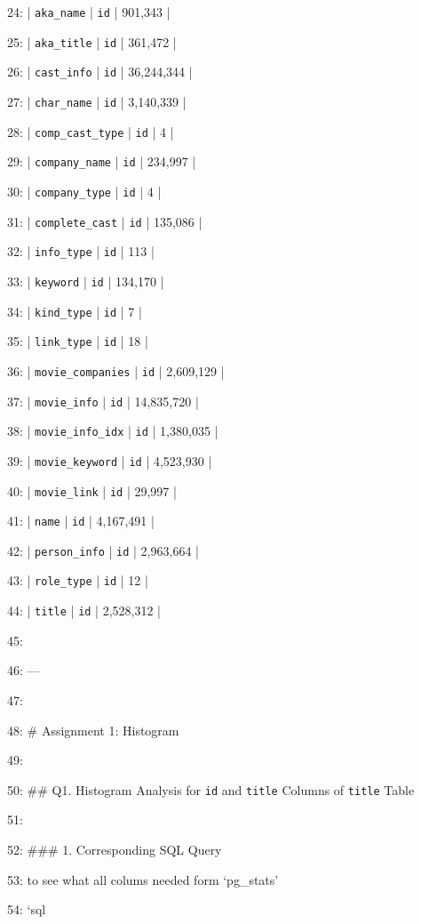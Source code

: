 \documentclass[11pt,a4paper]{article}
\begin{document}
24: | \texttt{aka\_name} | \texttt{id} | 901,343 |

25: | \texttt{aka\_title} | \texttt{id} | 361,472 |

26: | \texttt{cast\_info} | \texttt{id} | 36,244,344 |

27: | \texttt{char\_name} | \texttt{id} | 3,140,339 |

28: | \texttt{comp\_cast\_type} | \texttt{id} | 4 |

29: | \texttt{company\_name} | \texttt{id} | 234,997 |

30: | \texttt{company\_type} | \texttt{id} | 4 |

31: | \texttt{complete\_cast} | \texttt{id} | 135,086 |

32: | \texttt{info\_type} | \texttt{id} | 113 |

33: | \texttt{keyword} | \texttt{id} | 134,170 |

34: | \texttt{kind\_type} | \texttt{id} | 7 |

35: | \texttt{link\_type} | \texttt{id} | 18 |

36: | \texttt{movie\_companies} | \texttt{id} | 2,609,129 |

37: | \texttt{movie\_info} | \texttt{id} | 14,835,720 |

38: | \texttt{movie\_info\_idx} | \texttt{id} | 1,380,035 |

39: | \texttt{movie\_keyword} | \texttt{id} | 4,523,930 |

40: | \texttt{movie\_link} | \texttt{id} | 29,997 |

41: | \texttt{name} | \texttt{id} | 4,167,491 |

42: | \texttt{person\_info} | \texttt{id} | 2,963,664 |

43: | \texttt{role\_type} | \texttt{id} | 12 |

44: | \texttt{title} | \texttt{id} | 2,528,312 |

45:

46: ---

47:

48: \# Assignment 1: Histogram

49:

50: \#\# Q1. Histogram Analysis for \texttt{id} and \texttt{title} Columns of \texttt{title} Table

51:

52: \#\#\# 1. Corresponding SQL Query

53: to see what all colums needed form `pg\_stats'

54: \texttt{}`sql
\end{document}

